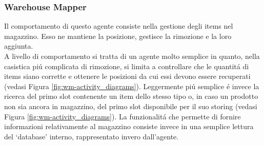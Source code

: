 \subsubsection{Warehouse Mapper}
Il comportamento di questo agente consiste nella gestione degli items nel magazzino. Esso ne mantiene la posizione, gestisce la rimozione e la loro aggiunta.\\
A livello di comportamento si tratta di un agente molto semplice in quanto, nella casistica pi\'u complicata di rimozione, si limita a controllare che le quantit\'a di items siano corrette e ottenere le posizioni da cui essi devono essere recuperati (vedasi Figura \ref{fig:wm-activity_diagrams}). Leggermente pi\'u semplice \'e invece la ricerca del primo slot contenente un item dello stesso tipo o, in caso un prodotto non sia ancora in magazzino, del primo slot disponibile per il suo storing (vedasi Figura \ref{fig:wm-activity_diagrams}). La funzionalit\'a che permette di fornire informazioni relativamente al magazzino consiste invece in una semplice lettura del `database' interno, rappresentato invero dall'agente.
